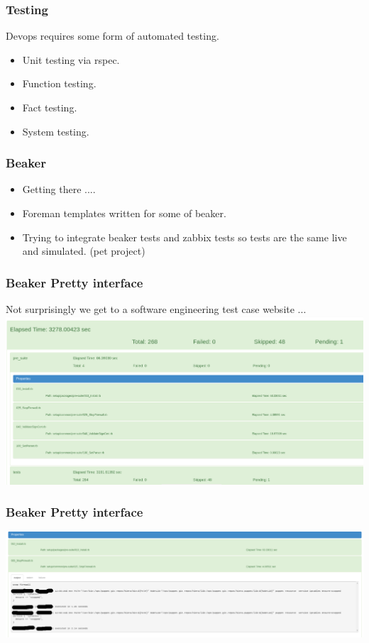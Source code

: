 \documentclass{beamer}
\begin{document}
\begin{frame}
  \frametitle{Testing}
  Devops requires some form of automated testing.
  \begin{itemize}
    \item Unit testing via rspec.
    \item Function testing.
    \item Fact testing.
    \item System testing.
  \end{itemize}
\end{frame}

\begin{frame}
    \frametitle{Beaker}
    \begin{itemize}
        \item Getting there .... \\
        \item Foreman templates written for some of beaker.
        \item Trying to integrate beaker tests and zabbix tests so tests are the same live and simulated. (pet project)
    \end{itemize}
    \end{frame}
\begin{frame}
    \frametitle{Beaker Pretty interface}
    Not surprisingly we get to a software engineering test case website ...\\
    \includegraphics[scale=0.25]{BeakerTest.pdf}
\end{frame}

\begin{frame}
    \frametitle{Beaker Pretty interface}
    \includegraphics[scale=0.25]{BeakerDetail.pdf}
\end{frame}
\end{document}
